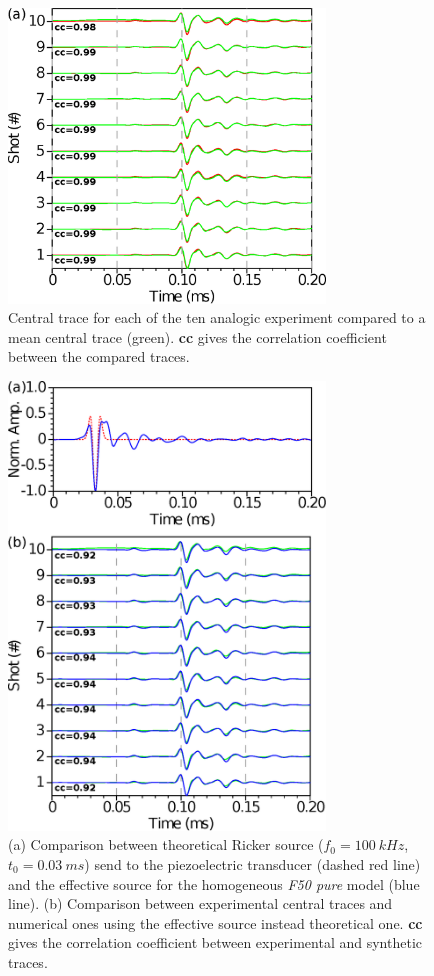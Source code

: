 \documentclass[manuscript,revised]{geophysics}
\begin{document}
\begin{figure}[!h]
	\centering
	\includegraphics[width=0.75\textwidth]{fig/musc_F50_CT.eps}
	\caption{Central trace for each of the ten analogic experiment compared to a mean central trace (green). \textbf{cc} gives the correlation coefficient between the compared traces.}
	\label{panel_central_traces_cc}
\end{figure}

\begin{figure}[!h]
	\centering
	\includegraphics[width=0.75\textwidth]{fig/spec_F50_CT_COMP.eps}
	\caption{(a) Comparison between theoretical Ricker source ($f_{0}=100\ kHz$, $t_{0}=0.03\ ms$) send to the piezoelectric transducer (dashed red line) and the effective source for the homogeneous \textit{F50 pure} model (blue line). (b) Comparison between experimental central traces and numerical ones using the effective source instead theoretical one. \textbf{cc} gives the correlation coefficient between experimental and synthetic traces.}
	\label{panel_srcest_2d_mean_comp}
\end{figure}
\end{document}
